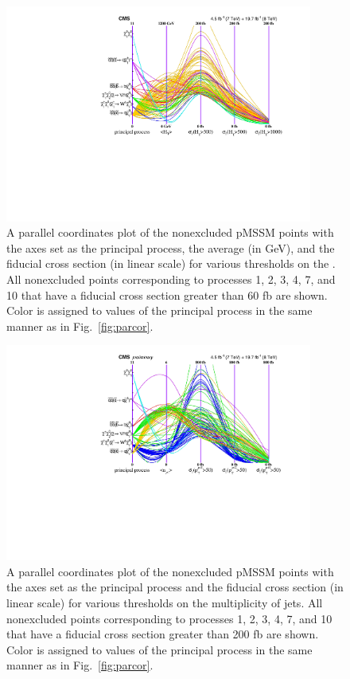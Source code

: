 \begin{figure}[tb!]
  \centering
         \includegraphics[width=0.9\textwidth]{figures/pMSSMpaper/parallel_coordinates/ParCorToposHT.pdf}
    \caption{A parallel coordinates plot of the nonexcluded pMSSM
      points with the axes set as the principal process, the average
      \HT{} (in GeV), and the 
    fiducial cross section (in linear scale) for various thresholds on the
    \HT{}. All nonexcluded points corresponding to processes 1, 2, 3,
    4, 7, and 10 that have a fiducial cross section greater than
    60 fb
    are shown. Color is assigned to
    values of the principal process in the same manner as in
    Fig.~\ref{fig:parcor}. }
    \label{fig:parcorHT}
\end{figure}
\begin{figure}[tb!]
  \centering
         \includegraphics[width=0.9\textwidth]{figures/pMSSMpaper/parallel_coordinates/ParCorToposJets.pdf}
    \caption{A parallel coordinates plot of the nonexcluded pMSSM
      points with the axes set as the principal process and the 
    fiducial cross section (in linear scale) for various thresholds on the
    multiplicity of jets. All nonexcluded points corresponding to processes 1, 2, 3,
    4, 7, and 10 that have a fiducial cross section greater than 200 fb are shown. Color is
    assigned to values of the principal process in the same manner as
    in Fig.~\ref{fig:parcor}. } 
    \label{fig:parcorNJets}
\end{figure}
